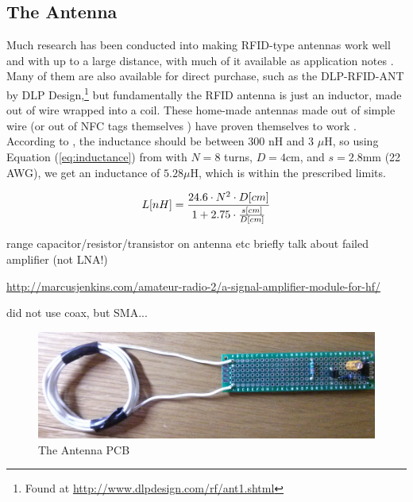 \documentclass[fleqn,10pt]{SelfArx} %
\begin{document}
\subsection{The Antenna}

Much research has been conducted into making RFID-type antennas work well and with up to a large distance, with much of it available as application notes \cite{mifare, antenna, pnantenna}. Many of them are also available for direct purchase, such as the DLP-RFID-ANT by DLP Design,\footnote{Found at \url{http://www.dlpdesign.com/rf/ant1.shtml}} but fundamentally the RFID antenna is just an inductor, made out of wire wrapped into a coil. These home-made antennas made out of simple wire (or out of NFC tags themselves \cite{nfcantenna}) have proven themselves to work \cite{wireantenna}. According to \cite{pnantenna}, the inductance should be between 300 nH and 3 $\mu$H, so using Equation (\ref{eq:inductance}) from \cite{pnantenna} with $N=8$ turns, $D=4$cm, and $s=2.8$mm (22 AWG), we get an inductance of $5.28 \mu$H, which is within the prescribed limits.

\begin{equation}
\label{eq:inductance}
\hfill L [nH] = \frac{24.6 \cdot N^2\cdot D[cm]}{1+2.75\cdot\frac{s[cm]}{D[cm]}}\hspace*{\fill}
\end{equation}

range
capacitor/resistor/transistor on antenna etc
briefly talk about failed amplifier (not LNA!)

\url{http://marcusjenkins.com/amateur-radio-2/a-signal-amplifier-module-for-hf/}

did not use coax, but SMA...


\begin{figure}[h]
  \includegraphics[width=\linewidth]{img/antennapic}
  \caption{The Antenna PCB}
  \label{fig:antennapic}
\end{figure}
\end{document}
